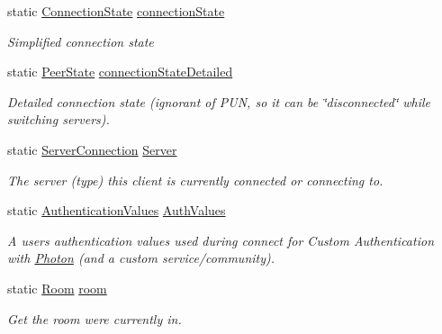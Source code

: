 \begin{DoxyCompactItemize}
static \hyperlink{_enums_8cs_acdd867d72142510ce53521a63a062f9b}{Connection\+State} \hyperlink{class_photon_network_aa2a46d8ce13fedd3f4550b6164524e81}{connection\+State}
\begin{DoxyCompactList}\small\item\em Simplified connection state \end{DoxyCompactList}\item 
static \hyperlink{group__public_api_ga91cc003c03acb26c6f1530440ebdbc88}{Peer\+State} \hyperlink{class_photon_network_a70403962dc524bb642e24de01b8fa43e}{connection\+State\+Detailed}
\begin{DoxyCompactList}\small\item\em Detailed connection state (ignorant of P\+UN, so it can be \char`\"{}disconnected\char`\"{} while switching servers). \end{DoxyCompactList}\item 
static \hyperlink{_enums_8cs_a85638c2837a71574f29802d46793c990}{Server\+Connection} \hyperlink{class_photon_network_a9225b990f7b3d0fffadc23c7b3118ef2}{Server}
\begin{DoxyCompactList}\small\item\em The server (type) this client is currently connected or connecting to. \end{DoxyCompactList}\item 
static \hyperlink{class_authentication_values}{Authentication\+Values} \hyperlink{class_photon_network_a282677f512ce2f53e4a0893d4e3844b8}{Auth\+Values}
\begin{DoxyCompactList}\small\item\em A user\textquotesingle{}s authentication values used during connect for Custom Authentication with \hyperlink{namespace_photon}{Photon} (and a custom service/community). \end{DoxyCompactList}\item 
static \hyperlink{class_room}{Room} \hyperlink{class_photon_network_ac7c6623c88f254b965aa366b1229781e}{room}
\begin{DoxyCompactList}\small\item\em Get the room we\textquotesingle{}re currently in. \end{DoxyCompactList}\item 

\end{DoxyCompactItemize}
